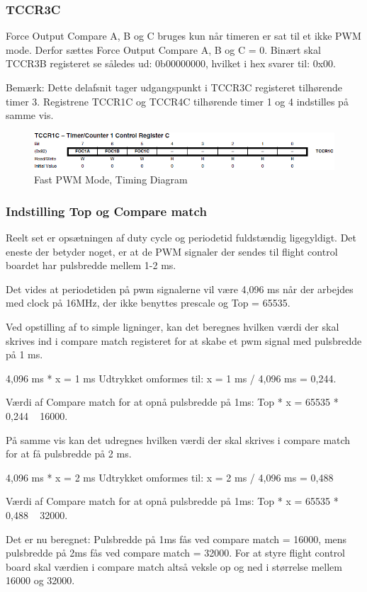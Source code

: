 \subsubsection*{TCCR3C}
Force Output Compare A, B og C bruges kun når timeren er sat til et ikke PWM mode.  Derfor sættes Force Output Compare A, B og C = 0.
Binært skal TCCR3B registeret se således ud: 0b00000000, hvilket i hex svarer til: 0x00. 

Bemærk: Dette delafsnit tager udgangspunkt i TCCR3C registeret tilhørende timer 3.  Registrene TCCR1C og TCCR4C tilhørende timer 1 og 4 indstilles på samme vis.

\begin{figure}[H]
	\centering
	\includegraphics[width=1.\textwidth]{Billeder/Timer/6_TCCT3C.png}
	\caption{Fast PWM Mode, Timing Diagram}
	\label{fig:Timing_diagram}
\end{figure}
 
\vspace{1cm}

\subsubsection*{Indstilling Top og Compare match}
Reelt set er opsætningen af duty cycle og periodetid fuldstændig ligegyldigt. Det eneste der betyder noget, er at de PWM signaler der sendes til flight control boardet har pulsbredde mellem 1-2 ms.
 
Det vides at periodetiden på pwm signalerne vil være 4,096 ms når der arbejdes med clock på 16MHz, der ikke benyttes prescale og Top = 65535.

Ved opstilling af to simple ligninger, kan det beregnes hvilken værdi der skal skrives ind i compare match registeret for at skabe et pwm signal med pulsbredde på 1 ms.  

4,096 ms * x = 1 ms	Udtrykket omformes til: 	x = 1 ms / 4,096 ms = 0,244.

Værdi af Compare match for at opnå pulsbredde på 1ms:  Top * x = 65535 * 0,244 ~ 16000.

På samme vis kan det udregnes hvilken værdi der skal skrives i compare match for at få pulsbredde på 2 ms.

4,096 ms * x = 2 ms	Udtrykket omformes til: 	x = 2 ms / 4,096 ms = 0,488

Værdi af Compare match for at opnå pulsbredde på 1ms:  Top * x = 65535 * 0,488 ~ 32000.

Det er nu beregnet: Pulsbredde på 1ms fås ved compare match = 16000, mens pulsbredde på 2ms fås ved compare match = 32000. For at styre flight control board skal værdien i compare match altså veksle op og ned i størrelse mellem 16000 og 32000. 






